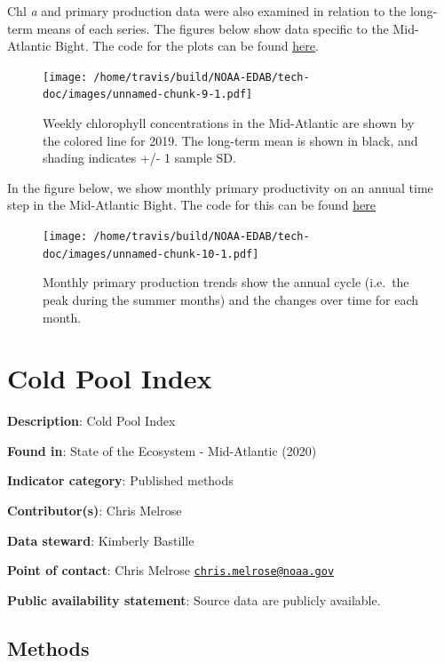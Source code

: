 \documentclass[
]{book}
\begin{document}
Chl \emph{a} and primary production data were also examined in relation to the long-term means of each series. The figures below show data specific to the Mid-Atlantic Bight. The code for the plots can be found \href{https://github.com/NOAA-EDAB/ecodata/blob/master/chunk-scripts/LTL.Rmd-mab-chl-weekly.R}{here}.

\begin{figure}
\centering
\texttt{[image: /home/travis/build/NOAA-EDAB/tech-doc/images/unnamed-chunk-9-1.pdf]}
\caption{\label{fig:unnamed-chunk-9}Weekly chlorophyll concentrations in the Mid-Atlantic are shown by the colored line for 2019. The long-term mean is shown in black, and shading indicates +/- 1 sample SD.}
\end{figure}

In the figure below, we show monthly primary productivity on an annual time step in the Mid-Atlantic Bight. The code for this can be found \href{https://github.com/NOAA-EDAB/ecodata/blob/master/chunk-scripts/LTL.Rmd-PP-OCCI.R}{here}

\begin{figure}
\centering
\texttt{[image: /home/travis/build/NOAA-EDAB/tech-doc/images/unnamed-chunk-10-1.pdf]}
\caption{\label{fig:unnamed-chunk-10}Monthly primary production trends show the annual cycle (i.e.~the peak during the summer months) and the changes over time for each month.}
\end{figure}

\hypertarget{cold-pool-index}{%
\chapter{Cold Pool Index}\label{cold-pool-index}}

\textbf{Description}: Cold Pool Index

\textbf{Found in}: State of the Ecosystem - Mid-Atlantic (2020)

\textbf{Indicator category}: Published methods

\textbf{Contributor(s)}: Chris Melrose

\textbf{Data steward}: Kimberly Bastille

\textbf{Point of contact}: Chris Melrose \href{mailto:chris.melrose@noaa.gov}{\nolinkurl{chris.melrose@noaa.gov}}

\textbf{Public availability statement}: Source data are publicly available.

\hypertarget{methods-9}{%
\section{Methods}\label{methods-9}}
\end{document}
